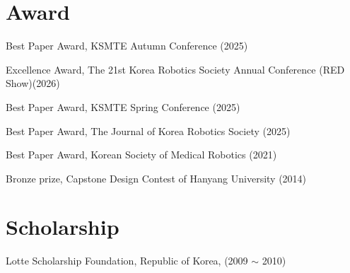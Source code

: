 \documentclass[margin,line]{res}
\begin{document}
\begin{resume}
\section{\sc Award}

Best Paper Award, KSMTE Autumn Conference (2025)

Excellence Award, The 21st Korea Robotics Society Annual Conference (RED Show)(2026)

Best Paper Award, KSMTE Spring Conference (2025)

Best Paper Award, The Journal of Korea Robotics Society (2025)

Best Paper Award, Korean Society of Medical Robotics (2021)

Bronze prize, Capstone Design Contest of Hanyang University (2014)

\section{\sc Scholarship}
Lotte Scholarship Foundation, Republic of Korea, (2009 $\sim$ 2010)




\end{resume}
\end{document}
